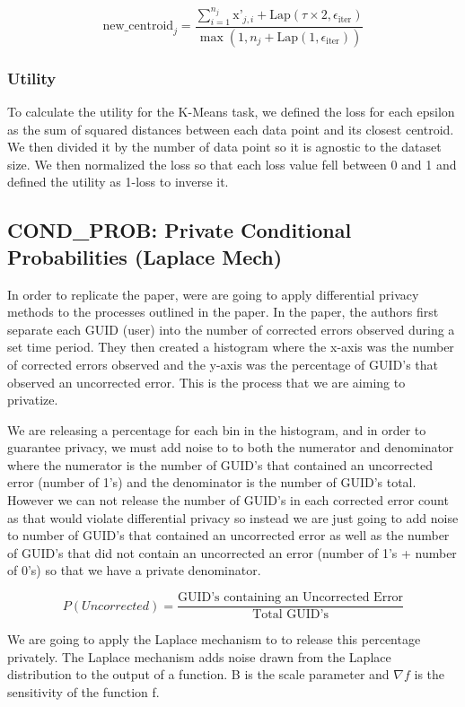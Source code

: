 \documentclass[12pt,letterpaper]{article}
\begin{document}
\[
\text{new\_centroid}_j=
\frac{
    \sum_{i=1}^{n_j} \text{x'}_{j,i} + \text{Lap}(\tau \times 2, \epsilon_{\text{iter}})
}{
    \max\left( 1, n_j + \text{Lap}(1, \epsilon_{\text{iter}}) \right)
}
\]

\subsubsection{Utility}
To calculate the utility for the K-Means task, we defined the loss for each
epsilon as the sum of squared distances between each data point and its closest centroid. We then divided it by the number of data point so it is agnostic to the dataset size. We then normalized the loss so that each loss value fell between 0 and 1 and defined the utility as
1-loss to inverse it.



\subsection{COND\_PROB: Private Conditional Probabilities (Laplace Mech)}

In order to replicate the paper, were are going to apply differential privacy methods to the processes outlined in the paper. In the paper, the authors first separate each GUID (user) into the number of corrected errors observed during a set time period. They then created a histogram where the x-axis was the number of corrected errors observed and the y-axis was the percentage of GUID's that observed an uncorrected error.\cite{Kwasnick2023} This is the process that we are aiming to privatize. 

We are releasing a percentage for each bin in the histogram, and in order to guarantee privacy, we must add noise to to both the numerator and denominator where the numerator is the number of GUID's that contained an uncorrected error (number of 1's) and the denominator is the number of GUID's total. However we can not release the number of GUID's in each corrected error count as that would violate differential privacy so instead we are just going to add noise to number of GUID's that contained an uncorrected error as well as the number of GUID's that did not contain an uncorrected an error (number of 1's + number of 0's) so that we have a private denominator. 

\[
P(Uncorrected) = \frac{\text{GUID's containing an Uncorrected Error}}{\text{Total GUID's}}
\]

We are going to apply the Laplace mechanism to to release this percentage privately. The Laplace mechanism adds noise drawn from the Laplace distribution to the output of a function. B is the scale parameter and $\nabla f$ is the sensitivity of the function f. \cite{DworkRoth}
\end{document}
